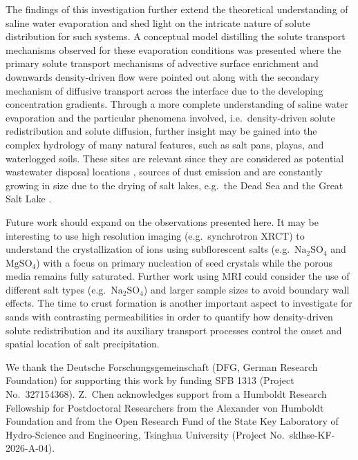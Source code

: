 \documentclass[final]{agujournal2019}
\begin{document}
The findings of this investigation further extend the theoretical understanding
of saline water evaporation and shed light on the intricate nature of solute
distribution for such systems. A conceptual model distilling the solute transport
mechanisms observed for these evaporation conditions was presented where the
primary solute transport mechanisms of advective surface enrichment and downwards
density-driven flow were pointed out along with the secondary mechanism of
diffusive transport across the interface due to the developing concentration
gradients. Through a more complete understanding of saline water evaporation and
the particular phenomena involved, i.e.\ density-driven solute redistribution and
solute diffusion, further insight may be gained into the complex hydrology of
many natural features, such as salt pans, playas, and waterlogged soils. These
sites are relevant since they are considered as potential wastewater disposal
locations \cite{wooding1997b}, sources of dust emission \cite{gill1996} and are
constantly growing in size due to the drying of salt lakes, e.g.\ the Dead Sea
and the Great Salt Lake \cite{wurtsbaugh2017}.

Future work should expand on the observations presented here. It may be
interesting to use high resolution imaging (e.g.\ synchrotron XRCT) to understand
the crystallization of ions using subflorescent salts
(e.g.\ \(\mathrm{Na_2SO_4}\) and \(\mathrm{MgSO_4}\)) with a focus on primary
nucleation of seed crystals while the porous
media remains fully saturated. Further work using MRI could consider the use of
different salt types (e.g.\ \(\mathrm{Na_2SO_4}\)) and larger sample sizes to avoid
boundary wall effects. The time to crust formation is another important aspect to
investigate for sands with contrasting permeabilities in order to quantify how
density-driven solute redistribution and its auxiliary transport processes
control the onset and spatial location of salt precipitation.

\acknowledgments
We thank the Deutsche Forschungsgemeinschaft (DFG, German Research Foundation)
for supporting this work by funding SFB 1313 (Project No.~327154368). Z.~Chen
acknowledges support from a Humboldt Research Fellowship for Postdoctoral
Researchers from the Alexander von Humboldt Foundation and from the Open Research
Fund of the State Key Laboratory of Hydro-Science and Engineering, Tsinghua
University (Project No.~sklhse-KF-2026-A-04).
\end{document}
